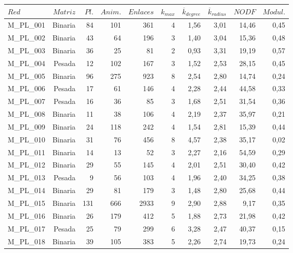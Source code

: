 \begin{table}[ht!]
\fontsize{2.2mm}{2.2mm}\selectfont
  \centering
    \begin{tabular}{lrrrrrrrrr}
    \toprule
    $Red$  & $Matriz$ & $Pl.$ & $Anim.$ & $Enlaces$ & $k_{max}$ & $\overline k_{degree}$ & $\overline k_{radius}$ & $NODF$ & $Modul.$ \\
    \midrule
     M\_PL\_001 & Binaria & 84   & 101  & 361  & 4    & 1,56 & 3,01 & 14,46 & 0,45 \\
    M\_PL\_002 & Binaria & 43   & 64   & 196  & 3    & 1,40 & 3,04 & 15,36 & 0,48 \\
    M\_PL\_003 & Binaria & 36   & 25   & 81   & 2    & 0,93 & 3,31 & 19,19 & 0,57 \\
    M\_PL\_004 & Pesada & 12   & 102  & 167  & 3    & 1,52 & 2,53 & 28,15 & 0,45 \\
    M\_PL\_005 & Binaria & 96   & 275  & 923  & 8    & 2,54 & 2,80 & 14,74 & 0,24 \\
    M\_PL\_006 & Pesada & 17   & 61   & 146  & 4    & 2,28 & 2,44 & 44,58 & 0,33 \\
    M\_PL\_007 & Pesada & 16   & 36   & 85   & 3    & 1,68 & 2,51 & 31,54 & 0,36 \\
    M\_PL\_008 & Binaria & 11   & 38   & 106  & 4    & 2,19 & 2,37 & 35,97 & 0,21 \\
    M\_PL\_009 & Binaria & 24   & 118  & 242  & 4    & 1,54 & 2,81 & 15,39 & 0,44 \\
    M\_PL\_010 & Binaria & 31   & 76   & 456  & 8    & 4,57 & 2,38 & 35,17 & 0,02 \\
    M\_PL\_011 & Binaria & 14   & 13   & 52   & 3    & 2,27 & 2,16 & 54,59 & 0,29 \\
    M\_PL\_012 & Binaria & 29   & 55   & 145  & 4    & 2,01 & 2,51 & 30,40 & 0,42 \\
    M\_PL\_013 & Pesada & 9    & 56   & 103  & 4    & 1,96 & 2,40 & 34,25 & 0,38 \\
    M\_PL\_014 & Binaria & 29   & 81   & 179  & 3    & 1,48 & 2,80 & 25,68 & 0,44 \\
    M\_PL\_015 & Binaria & 131  & 666  & 2933 & 9    & 2,90 & 2,88 & 9,17 & 0,35 \\
    M\_PL\_016 & Binaria & 26   & 179  & 412  & 5    & 1,88 & 2,73 & 21,98 & 0,42 \\
    M\_PL\_017 & Pesada & 25   & 79   & 299  & 6    & 3,28 & 2,47 & 40,37 & 0,15 \\
    M\_PL\_018 & Binaria & 39   & 105  & 383  & 5    & 2,26 & 2,74 & 19,73 & 0,24 \\

\end{tabular}
\end{table}

